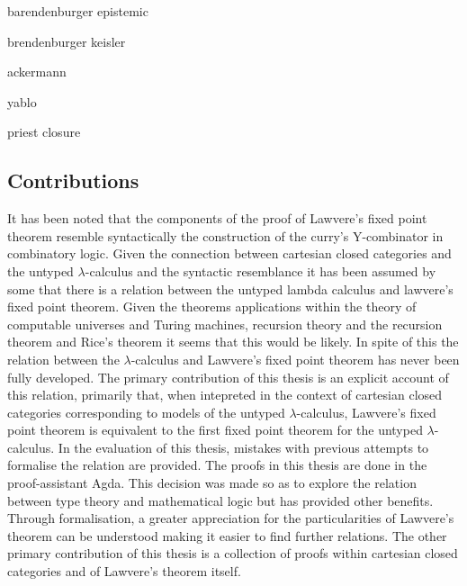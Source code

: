 barendenburger epistemic

brendenburger keisler

ackermann

yablo

priest closure


\subsection{Contributions}
It has been noted that the components of the proof of Lawvere's fixed point
theorem resemble syntactically the construction of the curry's Y-combinator in
combinatory logic. Given the connection between cartesian closed categories and
the untyped $\lambda$-calculus and the syntactic resemblance it has been assumed by
some that there is a relation between the untyped lambda calculus and lawvere's
fixed point theorem. Given the theorems applications within the theory of
computable universes and Turing machines, recursion theory and the recursion
theorem and Rice's theorem it seems that this would be likely. In spite of this
the relation between the $\lambda$-calculus and Lawvere's fixed point theorem has
never been fully developed. The primary contribution of this thesis is an
explicit account of this relation, primarily that, when intepreted in the
context of cartesian closed categories corresponding to models of the untyped
$\lambda$-calculus, Lawvere's fixed point theorem is equivalent to the first
fixed point theorem for the untyped $\lambda$-calculus. In the evaluation of
this thesis, mistakes with previous attempts to formalise the relation are
provided. The proofs in this thesis are done in the proof-assistant Agda. This
decision was made so as to explore the relation between type theory and
mathematical logic but has provided other benefits. Through formalisation, a
greater appreciation for the particularities of Lawvere's theorem can be
understood making it easier to find further relations. The other primary
contribution of this thesis is a collection of proofs within cartesian closed
categories and of Lawvere's theorem itself.

